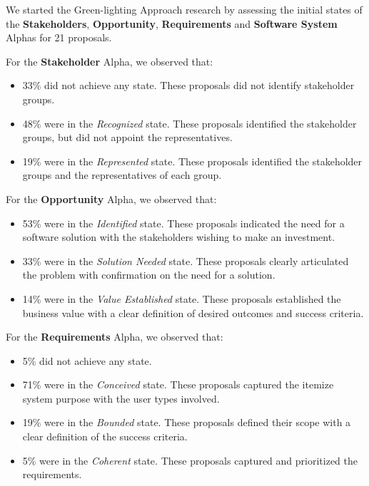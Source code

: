 \documentclass[conference]{IEEEtran}
\begin{document}
We started the Green-lighting Approach research by assessing the
initial states of the \textbf{Stakeholders}, \textbf{Opportunity},
\textbf{Requirements} and \textbf{Software System} Alphas for 21 proposals.

For the \textbf{Stakeholder} Alpha, we observed that:
\begin{itemize}
\itemsep1pt\parskip0pt
\item
  33\% did not achieve any state. These proposals did not identify
  stakeholder groups.
\item
  48\% were in the \textit{Recognized} state. These proposals identified the
  stakeholder groups, but did not appoint the representatives.
\item
  19\% were in the \textit{Represented} state. These proposals
  identified the stakeholder groups and the representatives of each
  group.
\end{itemize}

For the \textbf{Opportunity} Alpha, we observed that:
\begin{itemize}
\itemsep1pt\parskip0pt
\item
  53\% were in the \textit{Identified} state. These proposals indicated the
  need for a software solution with the stakeholders wishing to make an
  investment.
\item
  33\% were in the \textit{Solution Needed} state. These proposals clearly
  articulated the problem with confirmation on the need for a solution.
\item
  14\% were in the \textit{Value Established} state. These proposals
  established the business value with a clear definition of desired
  outcomes and success criteria.
\end{itemize}

For the \textbf{Requirements} Alpha, we observed that:
\begin{itemize}
\itemsep1pt\parskip0pt
\item
  5\% did not achieve any state.
\item
  71\% were in the \textit{Conceived} state. These proposals captured the 
  itemize system purpose with the user types involved.
\item
  19\% were in the \textit{Bounded} state. These proposals defined their 
  scope with a clear definition of the success criteria.
\item
  5\% were in the \textit{Coherent} state. These proposals captured and
  prioritized the requirements.
\end{itemize}
\end{document}
